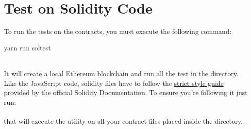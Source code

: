 \documentclass[ManualeSviluppatore]{subfiles}
\begin{document}
\section{Test on Solidity Code}
To run the tests on the contracts, you must execute the following command: \\
\begin{ttfamily} yarn run soltest \end{ttfamily} \\
It will create a local Ethereum blockchain and run all the test in the  directory. \\
Like the JavaScript code, solidity files have to follow the \href{https://solidity.readthedocs.io/en/v0.3.1/style-guide.html}{strict style guide} provided by the official Solidity Documentation. To ensure you're following it just run: \\
 \\
that will execute the  utility on all your contract files placed inside the  directory.
\end{document}
